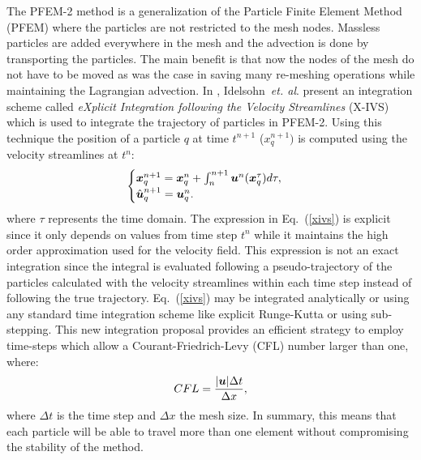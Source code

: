 The PFEM-2 method is a generalization of the Particle Finite Element Method (PFEM) \cite{sergio:pfem} where the particles are not restricted to the mesh nodes. Massless particles are added everywhere in the mesh and the advection is done by transporting the particles. The main benefit is that now the nodes of the mesh do not have to be moved as was the case in \cite{sergio:pfem} saving many re-meshing operations while maintaining the Lagrangian advection. In \cite{sergio:xivs1}, Idelsohn~{\sl et. al}. present an integration scheme called {\em eXplicit Integration following the Velocity Streamlines} (X-IVS) which is used to integrate the trajectory of particles in PFEM-2. Using this technique the position of a particle $q$ at time $t^{n+1}$ ($x_q^{n+1})$ is computed using the velocity streamlines at $t^n$:
%
\begin{equation}\label{xivs}
  \begin{cases}
    \boldsymbol{x}_q^{n+1}=\boldsymbol{x}_q^n+\int_n^{n+1} \boldsymbol{u}^n(\boldsymbol{x}_q^\tau) d\tau,\\
    \hat{\boldsymbol{u}}^{n+1}_q=\boldsymbol{u}_q^n.
  \end{cases}
\end{equation}
where $\tau$ represents the time domain.
%
The expression in Eq.~(\ref{xivs}) is explicit since it only depends on values from time step $t^n$ while it maintains the high order approximation used for the velocity field. This expression is not an exact integration since the integral is evaluated following a pseudo-trajectory of the particles calculated with the velocity streamlines within each time step instead of following the true trajectory. Eq.~(\ref{xivs}) may be integrated analytically or using any standard time integration scheme like explicit Runge-Kutta or using sub-stepping. This new integration proposal provides an efficient strategy to employ time-steps which allow a Courant-Friedrich-Levy (CFL) number larger than one, where:
%
\begin{equation}
  CFL=\frac{|\boldsymbol{u}|\Delta t}{\Delta x},
\end{equation}
where $\Delta t$ is the time step and $\Delta x$ the mesh size.
%
In summary, this means that each particle will be able to travel more than one element without compromising the stability of the method.

